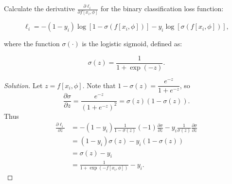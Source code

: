 \documentclass[10pt]{article}
\begin{document}
Calculate the derivative \( \frac{\partial \ell_i}{\partial f[x_i, \phi]} \) for the binary 
classification loss function:

\begin{equation}
\ell_i = -(1 - y_i) \log [1 - \sigma(f[x_i, \phi])] - y_i \log [\sigma(f[x_i, \phi])],
\end{equation}

where the function \( \sigma(\cdot) \) is the logistic sigmoid, defined as:

\begin{equation}
\sigma(z) = \frac{1}{1 + \exp(-z)}.
\end{equation}

\begin{proof}[Solution]
    Let \(z = f[x_i, \phi]\). Note that \(1 - \sigma(z) = \dfrac{e^{-z}}{1+e^{-z}}\), so
    \begin{equation*}
        \frac{\partial \sigma}{\partial z} = \frac{e^{-z}}{(1+e^{-z})^2} = \sigma(z) (1-\sigma(z)). 
    \end{equation*}
    Thus
    \begin{align*}
        \frac{\partial \ell_i}{\partial z} &= -(1-y_i) \frac{1}{1-\sigma(z)}(-1)\frac{\partial \sigma}{\partial z} - y_i \frac{1}{\sigma(z)}\frac{\partial \sigma}{\partial z} \\
        &= (1-y_i) \sigma(z) - y_i(1-\sigma(z)) \\
        &= \sigma(z) - y_i \\
        &= \frac{1}{1+\exp(-f[x_i, \phi])} - y_i. 
    \end{align*}
\end{proof}

\vspace{5em}
\end{document}
